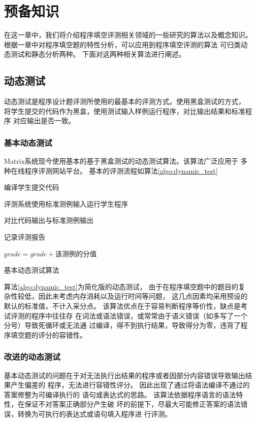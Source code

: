 \chapter{预备知识}
\label{cha:prepare-knowledge}
在这一章中，我们将介绍程序填空评测相关领域的一些研究的算法以及概念知识。
根据一章中对程序填空题的特性分析，可以应用到程序填空评测的算法
可归类动态测试和静态分析两种。
下面对这两种相关算法进行阐述。
\section{动态测试}
动态测试是程序设计题评测所使用的最基本的评测方式。使用黑盒测试的方式，
将学生提交的代码作为黑盒，使用测试输入样例运行程序，对比输出结果和标准程序
对应输出是否一致。
\subsection{基本动态测试}
Matrix系统现今使用基本的基于黑盒测试的动态测试算法。该算法广泛应用于
多种在线程序评测网站平台。
基本的评测流程如算法\ref{algo:dynamic_test}
\begin{algorithm}[h]
	编译学生提交代码

	 {
	   {
      评测系统使用标准测例输入运行学生程序

			 {
	      对比代码输出与标准测例输出

				记录评测报告

				 {
			    $grade = grade + $该测例的分值
			  }
	    }
	  }
	}
  \caption{基本动态测试算法}
  \label{algo:dynamic_test}
\end{algorithm}

算法\ref{algo:dynamic_test}为简化版的动态测试，
由于在程序填空题中的题目的复杂性较低，因此未考虑内存消耗以及运行时间等问题，
这几点因素均采用预设的默认的标准值，不计入采分点。
该算法优点在于容易判断程序等价性，缺点是考试评测的程序中往往存
在词法或语法错误，或常常由于语义错误（如多写了一个分号）导致死循环或无法通
过编译，得不到执行结果，导致得分为零，违背了程序填空题的评分的容错性。
\subsection{改进的动态测试}
基本动态测试的问题在于对无法执行出结果的程序或者因部分内容错误导致输出结果产生偏差的
程序，无法进行容错性评分。
因此出现了通过将语法编译不通过的答案修整为可编译执行的
语句或表达式的思路。
该算法依据程序语言的语法特性，在保证不对答案正确部分产生破
坏的前提下，尽最大可能修正答案的语法错误，转换为可执行的表达式或语句填入程序进
行评测。

